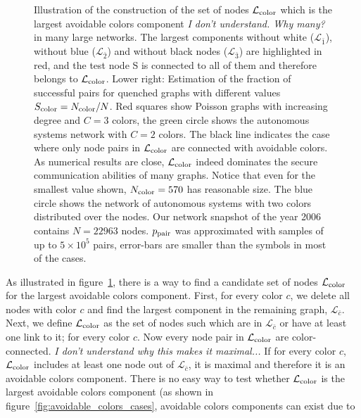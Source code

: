 \documentclass[aps, pre, twocolumn, a4paper, floatfix]{revtex4}
\newcommand{\red}{\color{red}}
\begin{document}
\begin{figure}[htb]
\begin{center}
    \caption{Illustration of the construction of the  set of nodes $\mathcal{L}_{\rm color}$ which is the largest avoidable colors component {\red \textit{I don't understand.  Why many?} in many large networks. }
    The largest components without white ($\mathcal{L}_{\bar 1}$), without blue ($\mathcal{L}_{\bar 2}$) and without 
    black nodes ($\mathcal{L}_{\bar 3}$) are highlighted in red, and the test node S is connected to 
    all of them and therefore belongs to $\mathcal{L}_{\rm color}$. Lower right: Estimation of the fraction 
    of successful pairs for quenched graphs with different values $S_{\rm color}=N_{\rm color}/N$. 
    Red squares show Poisson graphs with increasing degree and $C=3$ colors, the green circle 
    shows the autonomous systems network with $C=2$ colors. The black line indicates the case 
    where only node pairs in $\mathcal{L}_{\rm color}$ are connected with avoidable colors. As numerical 
    results are close, $\mathcal{L}_{\rm color}$ indeed dominates the secure communication abilities of many
    graphs.
    Notice that even for the smallest value shown, $N_{\rm color}=570$ has reasonable size. The blue circle shows the network of autonomous systems with two colors distributed over the nodes. Our network 
snapshot of the year 2006 contains $N=22963$ nodes. $p_{\rm pair}$ was approximated with 
samples of up to $5\times 10^5$ pairs, error-bars are smaller than the symbols in most 
of the cases. 
    }
    \label{fig:avoidable_colors_candidate}
\end{center}
\end{figure}
%
As illustrated in figure~\ref{fig:avoidable_colors_candidate}, 
there is a way to find a candidate set of nodes $\mathcal{L}_{\rm color}$ 
for the largest avoidable colors component.
First, for every color $c$, we delete all nodes with color $c$ 
and find the largest component in the remaining graph, $\mathcal{L}_{\bar c}$. 
Next, we define $\mathcal{L}_{\rm color}$ as the set of nodes such which are in $\mathcal{L}_{\bar c}$ or have at least one link to it; for every color $c$. 
Now every node pair in $\mathcal{L}_{\rm color}$ are color-connected. 
{\red \textit{I don't understand why this makes it maximal...}
If for every color $c$, $\mathcal{L}_{\rm color}$ includes at least one node out of $\mathcal{L}_{\bar c}$, 
it is maximal and therefore it is an avoidable colors component. }
There is no easy way to test whether $\mathcal{L}_{\rm color}$ is the largest avoidable colors component 
(as shown in figure~\ref{fig:avoidable_colors_cases}, avoidable colors components can exist due to 
\end{document}
